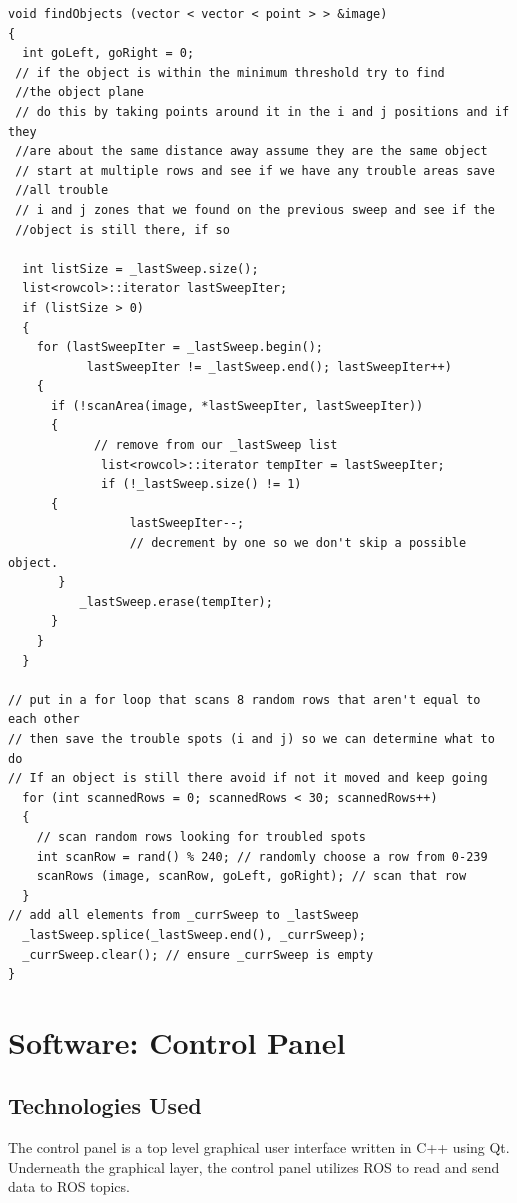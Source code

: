 \begin{lstlisting}
void findObjects (vector < vector < point > > &image)
{
  int goLeft, goRight = 0;
 // if the object is within the minimum threshold try to find 
 //the object plane
 // do this by taking points around it in the i and j positions and if they 
 //are about the same distance away assume they are the same object
 // start at multiple rows and see if we have any trouble areas save 
 //all trouble
 // i and j zones that we found on the previous sweep and see if the 
 //object is still there, if so 

  int listSize = _lastSweep.size();
  list<rowcol>::iterator lastSweepIter;
  if (listSize > 0)
  {
    for (lastSweepIter = _lastSweep.begin();
           lastSweepIter != _lastSweep.end(); lastSweepIter++)
    {
      if (!scanArea(image, *lastSweepIter, lastSweepIter))
      {
            // remove from our _lastSweep list
             list<rowcol>::iterator tempIter = lastSweepIter;	
             if (!_lastSweep.size() != 1)
	  {
                 lastSweepIter--; 
                 // decrement by one so we don't skip a possible object.
	   }	
          _lastSweep.erase(tempIter);
      }
    }
  }
  
// put in a for loop that scans 8 random rows that aren't equal to each other
// then save the trouble spots (i and j) so we can determine what to do
// If an object is still there avoid if not it moved and keep going
  for (int scannedRows = 0; scannedRows < 30; scannedRows++)
  {
    // scan random rows looking for troubled spots
    int scanRow = rand() % 240; // randomly choose a row from 0-239
    scanRows (image, scanRow, goLeft, goRight); // scan that row
  }
// add all elements from _currSweep to _lastSweep
  _lastSweep.splice(_lastSweep.end(), _currSweep); 
  _currSweep.clear(); // ensure _currSweep is empty
}
\end{lstlisting}

\section{Software: Control Panel }\label{softwarecontrolpanel}

\subsection{Technologies  Used}
The control panel is a top level graphical user interface written in C++ using Qt. Underneath the graphical layer, the control panel utilizes ROS to read and send data to ROS topics.

